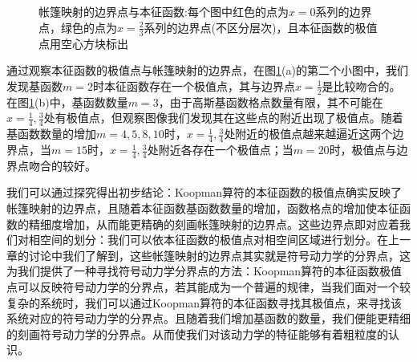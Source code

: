 \begin{figure}[!]
  \centering%
    \\
    \\
    \\
    \\
  \caption[帐篷映射的边界点与本征函数]{帐篷映射的边界点与本征函数:每个图中红色的点为$x=0$系列的边界点，绿色的点为$x=\frac{2}{3}$系列的边界点(不区分层次)，且本征函数的极值点用空心方块标出}\label{fig:Tent_eigen_noise_n1000m2d0}
\end{figure}

通过观察本征函数的极值点与帐篷映射的边界点，在图\ref{fig:Tent_eigen_noise_n1000m2d0}(a)的第二个小图中，我们发现基函数$m=2$时本征函数存在一个极值点，其与边界点$x=\frac{1}{2}$是比较吻合的。在图\ref{fig:Tent_eigen_noise_n1000m2d0}(b)中，基函数数量$m=3$，由于高斯基函数格点数量有限，其不可能在$x=\frac{1}{4},\frac{3}{4}$处有极值点，但观察图像我们发现其在这些点的附近出现了极值点。随着基函数数量的增加$m=4,5,8,10$时，$x=\frac{1}{4},\frac{3}{4}$处附近的极值点越来越逼近这两个边界点，当$m=15$时，$x=\frac{1}{4},\frac{3}{4}$处附近各存在一个极值点；当$m=20$时，极值点与边界点吻合的较好。

我们可以通过探究得出初步结论：Koopman算符的本征函数的极值点确实反映了帐篷映射的边界点，且随着本征函数基函数数量的增加，函数格点的增加使本征函数的精细度增加，从而能更精确的刻画帐篷映射的边界点。这些边界点即对应着我们对相空间的划分：我们可以依本征函数的极值点对相空间区域进行划分。在上一章的讨论中我们了解到，这些帐篷映射的边界点其实就是符号动力学的分界点，这为我们提供了一种寻找符号动力学分界点的方法：Koopman算符的本征函数极值点可以反映符号动力学的分界点，若其能成为一个普遍的规律，当我们面对一个较复杂的系统时，我们可以通过Koopman算符的本征函数寻找其极值点，来寻找该系统对应的符号动力学的分界点。且随着我们增加基函数的数量，我们便能更精细的刻画符号动力学的分界点。从而使我们对该动力学的特征能够有着粗粒度的认识。


